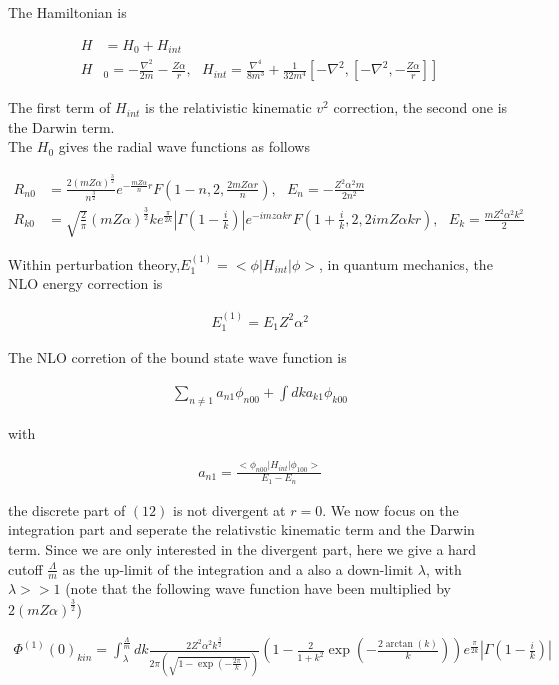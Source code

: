 \documentclass{article}
\begin{document}
The Hamiltonian is

\begin{align}
H&=H_0+H_{int}\\
H&_0=-\frac{\nabla^2}{2m}-\frac{Z\alpha}{r},\ \ \ H_{int}=\frac{\nabla^4}{8m^3}+\frac{1}{32m^4}[-\nabla^2,[-\nabla^2,-\frac{Z\alpha}{r}]]
\end{align}

The first term of $H_{int}$ is the relativistic kinematic $v^2$ correction, the second one is the Darwin term.\\
The $H_0$ gives the radial wave functions as follows

\begin{align}
R_{n0}&=\frac{2(mZ\alpha)^\frac{3}{2}}{n^\frac{3}{2}}e^{-\frac{mZ\alpha}{n}r}F(1-n,2,\frac{2mZ\alpha r}{n}),\ \ \ E_n=-\frac{Z^2\alpha^2m}{2n^2}\\
R_{k0}&=\sqrt{\frac{2}{\pi}}(mZ\alpha)^\frac{3}{2}ke^\frac{\pi}{2k}|\Gamma(1-\frac{i}{k})|e^{-imz\alpha kr}F(1+\frac{i}{k},2,2imZ\alpha kr),\ \ \ E_k=\frac{mZ^2\alpha^2k^2}{2}
\end{align} 

Within perturbation theory,$E_1^{(1)}=<\phi|H_{int}|\phi>$, in quantum mechanics, the NLO energy correction is

\begin{align}
E_1^{(1)}=E_1Z^2\alpha^2
\end{align}

The NLO corretion of the bound state wave function is

\begin{align}
\sum_{n\neq 1}a_{n1}\phi_{n00}+\int dka_{k1}\phi_{k00}
\end{align}

with 

\begin{align}
a_{n1}=\frac{<\phi_{n00}|H_{int}|\phi_{100}>}{E_1-E_n}
\end{align}

the discrete part of $(12)$ is not divergent at $r=0$. We now focus on the integration part and seperate the relativstic kinematic term and the Darwin term. Since we are only interested in the divergent part, here we give a hard cutoff $\frac{\Lambda}{m}$ as the up-limit of the integration and a also a down-limit $\lambda$, with $\lambda>>1$ (note that the following wave function have been multiplied by $2(mZ\alpha)^\frac{3}{2}$)

\begin{align}
\Phi^{(1)}(0)_{kin}=\int_\lambda^\frac{\Lambda}{m}dk \frac{2Z^2\alpha^2k^\frac{3}{2}}{2\pi(\sqrt{1-\exp(-\frac{2 \pi}{k})})}(1-\frac{2}{1+k^2}\exp(-\frac{2\arctan(k)}{k}))e^\frac{\pi}{2k}|\Gamma(1-\frac{i}{k})|
\end{align}
\end{document}
